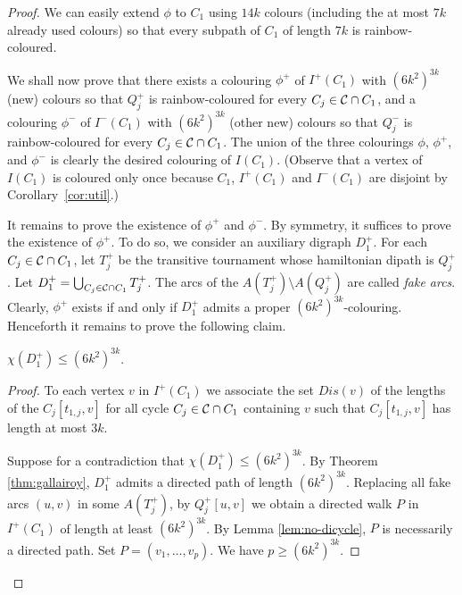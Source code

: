 \documentclass{endm}
\begin{document}
\begin{proof}
We can easily extend $\phi$ to $C_1$ using $14k$ colours (including the at most $7k$ already used colours)
so that every subpath of $C_1$ of length $7k$ is rainbow-coloured.

We shall now prove that there exists a colouring $\phi^+$ of $I^+(C_1)$ with $(6k^2)^{3k}$ (new) colours so that $Q^+_j$ is rainbow-coloured for every $C_j\in {\cal C}\cap C_1$, and a colouring $\phi^-$ of $I^-(C_1)$ with $(6k^2)^{3k}$ (other new) colours so that $Q^-_j$ is rainbow-coloured for every $C_j\in {\cal C}\cap C_1$.
The union of the three colourings $\phi$, $\phi^+$, and $\phi^-$ is clearly the desired colouring of $I(C_1)$. (Observe that a vertex of $I(C_1)$ is coloured only once because  $C_1$, $I^+(C_1)$ and $I^-(C_1)$ are disjoint by Corollary~\ref{cor:util}.)

\smallskip

It remains to prove the existence of $\phi^+$ and $\phi^-$. By symmetry, it suffices to prove the existence of $\phi^+$.
 To do so, we consider an auxiliary digraph $D^+_1$.
 For each $C_j\in {\cal C}\cap C_1$, let $T^+_j$ be the transitive tournament whose hamiltonian dipath is $Q^+_j$.
Let $D^+_1=\bigcup_{C_j\in  {\cal C}\cap C_1} T^+_j$. 
The arcs of the $A(T^+_j)\setminus A(Q^+_j)$ are called {\it fake arcs}.
Clearly, $\phi^+$ exists if and only if $D^+_1$ admits a proper $(6k^2)^{3k}$-colouring. Henceforth it remains to prove the following claim.

\begin{claim}\label{claim:c+}
$\chi(D^+_1) \leq  (6k^2)^{3k}$.
\end{claim}

\begin{proof}
To each vertex $v$ in $I^+(C_1)$ we associate the set $Dis(v)$ of the lengths of the $C_j[t_{1,j},v]$ for all cycle $C_j\in {\cal C} \cap C_1$ containing $v$ such that $C_j[t_{1,j},v]$ has length at most $3k$.


Suppose for a contradiction that $\chi(D^+_1) \leq  (6k^2)^{3k}$.
By Theorem \ref{thm:gallairoy}, $D^+_1$ admits a directed path of length $(6k^2)^{3k}$. Replacing all fake arcs  $(u,v)$ in some $A(T^+_j)$, by 
$Q^+_j[u,v]$ we obtain a directed walk $P$ in $I^+(C_1)$ of length at least $(6k^2)^{3k}$. By Lemma \ref{lem:no-dicycle}, $P$ is necessarily a directed path. Set $P=(v_1,  \dots , v_{p})$. We have $p\geq (6k^2)^{3k}$.


\end{proof}
\end{proof}
\end{document}
